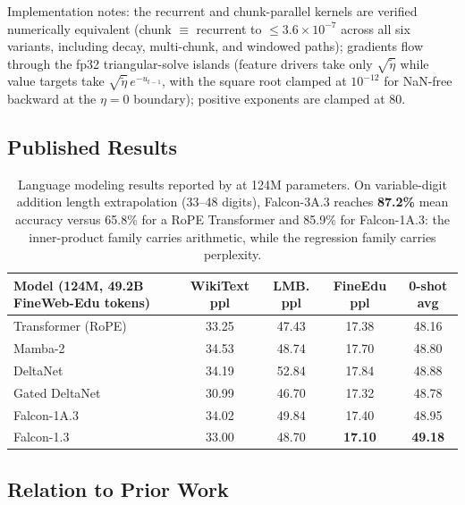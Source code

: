 Implementation notes: the recurrent and chunk-parallel kernels are verified numerically equivalent (chunk $\equiv$ recurrent to $\le 3.6 \times 10^{-7}$ across all six variants, including decay, multi-chunk, and windowed paths); gradients flow through the fp32 triangular-solve islands (feature drivers take only $\sqrt{\tilde{\eta}}$ while value targets take $\sqrt{\tilde{\eta}}\, e^{-u_{t-1}}$, with the square root clamped at $10^{-12}$ for NaN-free backward at the $\eta = 0$ boundary); positive exponents are clamped at $80$.

\subsection{Published Results}

\begin{table}[H]
\centering
\small
\begin{tabularx}{0.95\linewidth}{Xcccc}
\toprule
\textbf{Model (124M, 49.2B FineWeb-Edu tokens)} & \textbf{WikiText ppl} & \textbf{LMB. ppl} & \textbf{FineEdu ppl} & \textbf{0-shot avg} \\
\midrule
Transformer (RoPE) & 33.25 & 47.43 & 17.38 & 48.16 \\
Mamba-2 & 34.53 & 48.74 & 17.70 & 48.80 \\
DeltaNet & 34.19 & 52.84 & 17.84 & 48.88 \\
Gated DeltaNet & 30.99 & 46.70 & 17.32 & 48.78 \\
Falcon-1A.3 & 34.02 & 49.84 & 17.40 & 48.95 \\
Falcon-1.3 & 33.00 & 48.70 & \textbf{17.10} & \textbf{49.18} \\
\bottomrule
\end{tabularx}
\caption{Language modeling results reported by \citet{zhang_falcon_2026} at 124M parameters. On variable-digit addition length extrapolation (33--48 digits), Falcon-3A.3 reaches \textbf{87.2\%} mean accuracy versus 65.8\% for a RoPE Transformer and 85.9\% for Falcon-1A.3: the inner-product family carries arithmetic, while the regression family carries perplexity.}
\label{tab:falcon-results}
\end{table}

\subsection{Relation to Prior Work}


